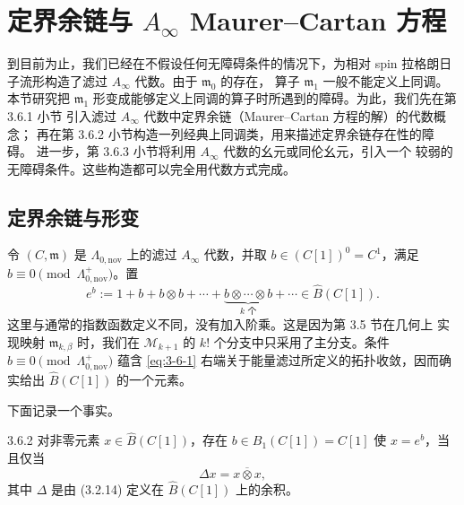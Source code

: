 
\section{定界余链与 $A_\infty$ Maurer--Cartan 方程}
\label{sec:3-6}

到目前为止，我们已经在不假设任何无障碍条件的情况下，为相对 spin
拉格朗日子流形构造了滤过 $A_\infty$ 代数。由于 $\mathfrak m_0$ 的存在，
算子 $\mathfrak m_1$ 一般不能定义上同调。本节研究把 $\mathfrak m_1$
形变成能够定义上同调的算子时所遇到的障碍。为此，我们先在第 3.6.1 小节
引入滤过 $A_\infty$ 代数中定界余链（Maurer--Cartan 方程的解）的代数概念；
再在第 3.6.2 小节构造一列经典上同调类，用来描述定界余链存在性的障碍。
进一步，第 3.6.3 小节将利用 $A_\infty$ 代数的幺元或同伦幺元，引入一个
较弱的无障碍条件。这些构造都可以完全用代数方式完成。

\subsection{定界余链与形变}
\label{subsec:3-6-1}

令 $(C,\mathfrak m)$ 是 $\Lambda_{0,\mathrm{nov}}$ 上的滤过
$A_\infty$ 代数，并取
$b\in(C[1])^0=C^1$，满足
$b\equiv0\pmod{\Lambda^+_{0,\mathrm{nov}}}$。置
\begin{equation}
  e^b:=1+b+b\otimes b+\cdots
  +\underbrace{b\otimes\cdots\otimes b}_{k\text{ 个}}+\cdots
  \in\widehat B(C[1]).
  \tag{3.6.1}\label{eq:3-6-1}
\end{equation}
这里与通常的指数函数定义不同，没有加入阶乘。这是因为第 3.5 节在几何上
实现映射 $\mathfrak m_{k,\beta}$ 时，我们在 $\mathcal M_{k+1}$ 的
$k!$ 个分支中只采用了主分支。条件
$b\equiv0\pmod{\Lambda^+_{0,\mathrm{nov}}}$ 蕴含
\eqref{eq:3-6-1} 右端关于能量滤过所定义的拓扑收敛，因而确实给出
$\widehat B(C[1])$ 的一个元素。

下面记录一个事实。

\begin{lemma}{3.6.2}\label{lem:3-6-2}
对非零元素 $x\in\widehat B(C[1])$，存在
$b\in B_1(C[1])=C[1]$ 使 $x=e^b$，当且仅当
\[
  \Delta x=x\mathbin{\overline\otimes}x,
\]
其中 $\Delta$ 是由 (3.2.14) 定义在 $\widehat B(C[1])$ 上的余积。
\end{lemma}

